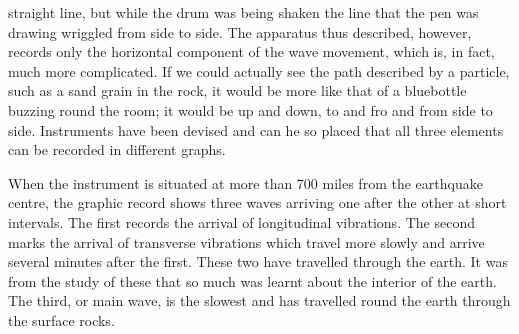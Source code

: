 \documentclass[kindlepaper]{BHCexam4kindle}
\begin{document}
straight line, but while the drum was being shaken the line that the pen was drawing wriggled from side to side.
The apparatus thus described, however, records only the horizontal component of the wave movement, which
is, in fact, much more complicated. If we could actually see the path described by a particle, such as a sand
grain in the rock, it would be more like that of a bluebottle buzzing round the room; it would be up and down,
to and fro and from side to side. Instruments have been devised and can he so placed that all three elements can
be recorded in different graphs.
\par
When the instrument is situated at more than 700 miles from the earthquake centre, the graphic record
shows three waves arriving one after the other at short intervals. The first records the arrival of longitudinal
vibrations. The second marks the arrival of transverse vibrations which travel more slowly and arrive several
minutes after the first. These two have travelled through the earth. It was from the study of these that so much
was learnt about the interior of the earth. The third, or main wave, is the slowest and has travelled round the
earth through the surface rocks.
\clearpage
\end{document}
